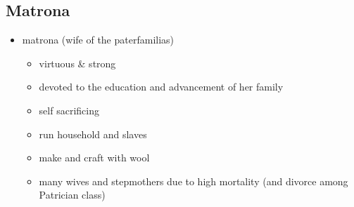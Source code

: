 \documentclass[12pt, twoside]{article}
\begin{document}
\subsection{Matrona}
\begin{itemize}
\item matrona (wife of the paterfamilias)
	\begin{itemize}
	\item virtuous \& strong
	\item devoted to the education and advancement of her family
	\item self sacrificing
	\item run household and slaves
	\item make and craft with wool
	\item many wives and stepmothers due to high mortality (and divorce among Patrician class)
	\end{itemize}
\end{itemize}
\end{document}
